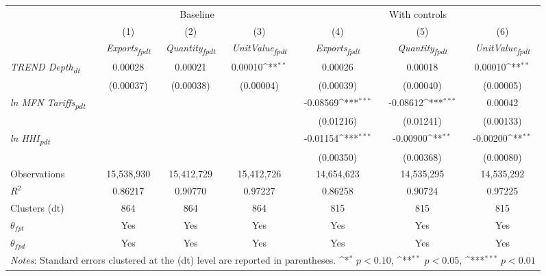 {
\def\sym#1{\ifmmode^{#1}\else\(^{#1}\)\fi}
\begin{tabular}{l*{6}{c}}
\toprule
&\multicolumn{3}{c}{Baseline}&\multicolumn{3}{c}{With controls}\\\cmidrule(lr){2-4}\cmidrule(lr){5-7}
&(1)&(2)&(3)&(4)&(5)&(6)\\
&\textit{Exports\textsubscript{fpdt}}&\textit{Quantity\textsubscript{fpdt}}&\textit{UnitValue\textsubscript{fpdt}}&\textit{Exports\textsubscript{fpdt}}&\textit{Quantity\textsubscript{fpdt}}&\textit{UnitValue\textsubscript{fpdt}}\\
\midrule
\textit{TREND Depth\textsubscript{dt}} & 0.00028 & 0.00021 & 0.00010\sym{**} & 0.00026 & 0.00018 & 0.00010\sym{**}\\
 & (0.00037) & (0.00038) & (0.00004) & (0.00039) & (0.00040) & (0.00005)\\
\addlinespace
\textit{ln MFN Tariffs\textsubscript{pdt}} &  &  &  & -0.08569\sym{***} & -0.08612\sym{***} & 0.00042\\
 &  &  &  & (0.01216) & (0.01241) & (0.00133)\\
\addlinespace
\textit{ln HHI\textsubscript{pdt}} &  &  &  & -0.01154\sym{***} & -0.00900\sym{**} & -0.00200\sym{**}\\
 &  &  &  & (0.00350) & (0.00368) & (0.00080)\\
\midrule
Observations & 15,538,930 & 15,412,729 & 15,412,726 & 14,654,623 & 14,535,295 & 14,535,292\\
$R^{2}$ & 0.86217 & 0.90770 & 0.97227 & 0.86258 & 0.90724 & 0.97225\\
Clusters (dt) & 864 & 864 & 864 & 815 & 815 & 815\\
$\theta_{fpt}$ & Yes & Yes & Yes & Yes & Yes & Yes\\
$\theta_{fpd}$ & Yes & Yes & Yes & Yes & Yes & Yes\\
\bottomrule
\multicolumn{7}{l}{\footnotesize \textit{Notes}: Standard errors clustered at the (dt) level are reported in parentheses. \sym{*} \(p<0.10\), \sym{**} \(p<0.05\), \sym{***} \(p<0.01\)}\\
\end{tabular}
}
